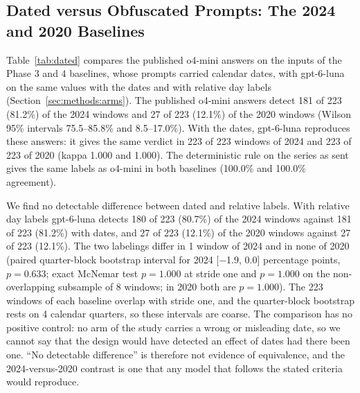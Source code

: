 \subsection{Dated versus Obfuscated Prompts: The 2024 and 2020 Baselines}
\label{sec:results:dated}

Table~\ref{tab:dated} compares the published o4-mini answers on the inputs of the Phase 3 and 4 baselines, whose prompts carried calendar dates, with gpt-6-luna on the same values with the dates and with relative day labels (Section~\ref{sec:methods:arms}).
The published o4-mini answers detect 181 of 223 (81.2\%) of the 2024 windows and 27 of 223 (12.1\%) of the 2020 windows (Wilson 95\% intervals 75.5--85.8\% and 8.5--17.0\%). With the dates, gpt-6-luna reproduces these answers: it gives the same verdict in 223 of 223 windows of 2024 and 223 of 223 of 2020 (kappa 1.000 and 1.000). The deterministic rule on the series as sent gives the same labels as o4-mini in both baselines (100.0\% and 100.0\% agreement).

We find no detectable difference between dated and relative labels. With relative day labels gpt-6-luna detects 180 of 223 (80.7\%) of the 2024 windows against 181 of 223 (81.2\%) with dates, and 27 of 223 (12.1\%) of the 2020 windows against 27 of 223 (12.1\%). The two labelings differ in 1 window of 2024 and in none of 2020 (paired quarter-block bootstrap interval for 2024 [$-$1.9, 0.0] percentage points, $p=0.633$; exact McNemar test $p=1.000$ at stride one and $p=1.000$ on the non-overlapping subsample of 8 windows; in 2020 both are $p=1.000$). The 223 windows of each baseline overlap with stride one, and the quarter-block bootstrap rests on 4 calendar quarters, so these intervals are coarse. The comparison has no positive control: no arm of the study carries a wrong or misleading date, so we cannot say that the design would have detected an effect of dates had there been one. ``No detectable difference'' is therefore not evidence of equivalence, and the 2024-versus-2020 contrast is one that any model that follows the stated criteria would reproduce.

